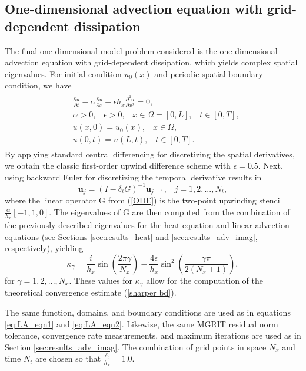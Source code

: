 \documentclass[VANCOUVER,STIX1COL]{WileyNJD-v2}
\begin{document}
\subsection{One-dimensional advection equation with grid-dependent dissipation}
\label{sec:1dadv_complex}
The final one-dimensional model problem considered is the one-dimensional advection equation with grid-dependent 
dissipation, which yields complex spatial eigenvalues.  For initial condition $u_0(x)$ and periodic spatial
boundary condition, we have
\begin{align}
\begin{split}
&\frac{\partial u}{\partial t} - \alpha \frac{\partial u}{\partial x} - \epsilon h_x \frac{\partial^2 u}{\partial x^2} = 0, \\
&\alpha > 0, \hspace{10pt} \epsilon > 0, \hspace{10pt} x \in \Omega = [0, L], \hspace{10pt} t \in [0, T], \\
&u(x, 0) = u_0(x), \hspace{10pt} x \in \Omega, \\
&u(0, t) = u(L, t), \hspace{10pt} t \in [0, T] .
\end{split}
\end{align}
By applying standard central differencing for discretizing the spatial derivatives, we obtain the classic first-order upwind difference scheme with $\epsilon = 0.5$. Next, using backward Euler for discretizing the temporal derivative results in
\begin{equation}
\mathbf{u}_j = (I - \delta_t G)^{-1} \mathbf{u}_{j-1}, \hspace{10pt} j=1,2,...,N_t,
\end{equation}
where the linear operator G from (\ref{ODE}) is the two-point upwinding stencil $\frac{\alpha}{h_x} [-1, 1, 0]$. The eigenvalues of G are then computed from the combination of the previously described eigenvalues for the heat equation and linear advection equations (see Sections \ref{sec:results_heat} and \ref{sec:results_adv_imag}, respectively),
 yielding 
 $$\kappa_{\gamma} = \frac{i}{h_x} \sin \left(\frac{2 \pi \gamma}{N_x}\right) - \frac{4 \epsilon}{h_x} \sin^2 \left( \frac{\gamma \pi}{2(N_x + 1)} \right),$$
 for $\gamma = 1,2,...,N_x$.
These values for $\kappa_{\gamma}$ allow for the computation of the theoretical convergence estimate 
(\ref{sharper bd}).  

The same function, domains, and boundary conditions are used as in equations \eqref{eq:LA_eqn1} and 
\eqref{eq:LA_eqn2}.  Likewise, the same MGRIT residual norm tolerance, convergence rate measurements, and maximum iterations are used as in 
Section \ref{sec:results_adv_imag}. The combination of grid points in space $N_x$ and time $N_t$ are chosen 
so that $\frac{\delta_t}{h_x} = 1.0$.
\end{document}
